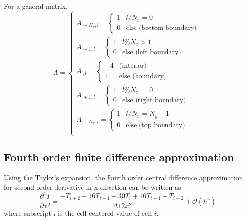 \documentclass[12pt]{amsart}   %
\begin{document}
For a general matrix,
\begin{equation}
A = \begin{cases}
A_{l-N_x,l}= \begin{cases}
1 & l/N_x = 0 \\
0 & \text{else (bottom boundary)}
\end{cases}\\
A_{l-1,l}= \begin{cases}
1 & l\% N_x > 1  \\
0 & \text{else (left boundary)}
\end{cases} \\
A_{l,l}= \begin{cases}
-4 & \text{(interior)} \\
1 & \text{else (boundary)}
\end{cases} \\
A_{l+1,l}= \begin{cases}
1 & l\% N_x ~= 0 \\
0 & \text{else (right boundary)}
\end{cases} \\
A_{l-N_x,l}= \begin{cases}
1 & l/N_x = N_y-1 \\
0 & \text{else (top boundary)}
\end{cases}\\
\end{cases}
\end{equation}

\subsection{Fourth order finite difference approximation}
Using the Taylor's expansion, the fourth order central difference approximation for second order derivative in x direction can be written as:
\begin{equation}\label{eq:19}
 \frac{ \partial^2 T}{\partial x^2}=\frac{-T_{i+2}+16T_{i+1} -30T_{i} + 16T_{i-1} - T_{i-2}}{\Delta 12x^2}+\mathcal{O}(h^4)
\end{equation}
where subscript $i$ is the cell centered value of cell $i$.
\end{document}
